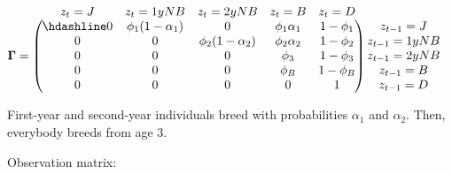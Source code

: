 \documentclass[
  12pt,
]{krantz}
\begin{document}
\[\begin{matrix}
& \\
\mathbf{\Gamma} =
  \left ( \vphantom{ \begin{matrix} 12 \\ 12 \\ 12 \\ 12 \\ 12 \end{matrix} } \right .
          \end{matrix}
          \hspace{-1.2em}
          \begin{matrix}
          z_t=J & z_t=1yNB & z_t=2yNB & z_t=B & z_t=D \\ \hdashline
          0 & \phi_1 (1-\alpha_1) & 0 & \phi_1 \alpha_1 & 1 - \phi_1\\
          0 & 0 & \phi_2 (1-\alpha_2) & \phi_2 \alpha_2 & 1 - \phi_2\\
          0 & 0 & 0 & \phi_3 & 1 - \phi_3\\
          0 & 0 & 0 & \phi_B & 1 - \phi_B\\
          0 & 0 & 0 & 0 & 1
          \end{matrix}
          \hspace{-0.2em}
          \begin{matrix}
          & \\
          \left . \vphantom{ \begin{matrix} 12 \\ 12 \\ 12 \\ 12 \\ 12 \end{matrix} } \right )
\begin{matrix}
z_{t-1} = J \\ z_{t-1} = 1yNB \\ z_{t-1} = 2yNB \\ z_{t-1} = B \\ z_{t-1} = D
\end{matrix}
\end{matrix}\]

First-year and second-year individuals breed with probabilities \(\alpha_1\) and \(\alpha_2\). Then, everybody breeds from age 3.

Observation matrix:
\end{document}
